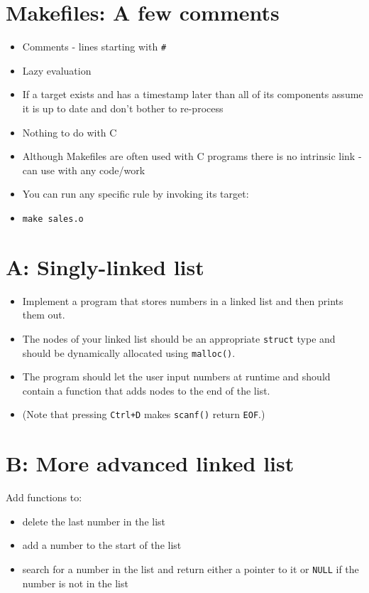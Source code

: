 \documentclass{article}
\begin{document}
\section{Makefiles: A few comments}
\begin{itemize}
\item Comments - lines starting with \verb!#!
\item Lazy evaluation
\item If a target exists and has a timestamp later than all of its components assume it is up to date and don't bother to re-process
\item Nothing to do with C
\item Although Makefiles are often used with C programs there is no intrinsic link - can use with any code/work
\item You can run any specific rule by invoking its target:
\item \verb!make sales.o!
\end{itemize}




\section{A: Singly-linked list}
\begin{itemize}
\item Implement a program that stores numbers in a linked list and then prints them out.
\item The nodes of your linked list should be an appropriate \verb!struct! type and should be dynamically allocated using \verb!malloc()!.
\item The program should let the user input numbers at runtime and should contain a function that adds nodes to the end of the list.
\item (Note that pressing \verb!Ctrl+D! makes \verb!scanf()! return \verb!EOF!.)
\end{itemize}



\section{B: More advanced linked list}
Add functions to:
\begin{itemize}
\item delete the last number in the list
\item add a number to the start of the list
\item search for a number in the list and return either a pointer to it or \verb!NULL! if the number is not in the list
\end{itemize}
\end{document}

